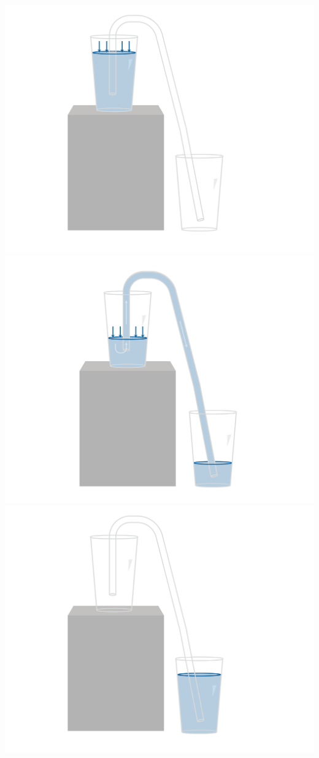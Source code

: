 \includegraphics[width=\textwidth]{siphonStraw1.png}
\includegraphics[width=\textwidth]{siphonStraw2.png}
\includegraphics[width=\textwidth]{siphonStraw3.png}


